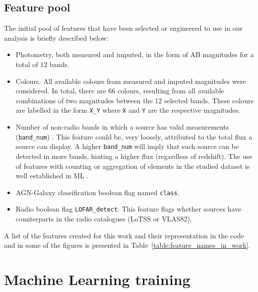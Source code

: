 \documentclass{aa}
\begin{document}
\subsection{Feature pool}\label{sec:feature_creation}

The initial pool of features that have been selected or engineered to use in our analysis is briefly described below:

\begin{itemize}
    \item Photometry, both measured and imputed, in the form of AB magnitudes for a total of $12$ bands.
    
    \item Colours. All available colours from measured and imputed magnitudes were considered. In total, there are $66$ colours, resulting from all available combinations of two magnitudes between the $12$ selected bands. These colours are labelled in the form \verb|X_Y| where \verb|X| and \verb|Y| are the respective magnitudes.

    \item Number of non-radio bands in which a source has valid measurements (\verb|band_num|) . This feature could be, very loosely, attributed to the total flux a source can display. A higher \verb|band_num| will imply that such source can be detected in more bands, hinting a higher flux (regardless of redshift). The use of features with counting or aggregation of elements in the studied dataset is well established in ML \citep[see, for example,][]{zheng2018feature, duboue2020art, 2021AJ....161..141S, 2023A&A...671A..99E}.
    
    \item AGN-Galaxy classification boolean flag named \verb|class|.
    
    \item Radio boolean flag \verb|LOFAR_detect|. This feature flags whether sources have counterparts in the radio catalogues (LoTSS or VLAS82).
\end{itemize}

A list of the features created for this work and their representation in the code and in some of the figures is presented in Table~\ref{table:feature_names_in_work}.

\section{Machine Learning training}\label{sec:ML_training}
\end{document}
